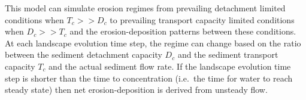 \documentclass[gmd, manuscript]{copernicus}
\begin{document}
%
%


This model can simulate erosion regimes 
from prevailing detachment limited conditions when $T_c >> D_c$ 
to prevailing transport capacity limited conditions when $D_c >> T_c$
and the erosion-deposition patterns between these conditions.
At each landscape evolution time step, the regime can change based on 
the ratio between the sediment detachment capacity $D_c$
and the sediment transport capacity $T_c$ and the actual sediment flow rate.
If the landscape evolution time step is shorter than the time to concentration 
(i.e.~the time for water to reach steady state)
then net erosion-deposition is derived from unsteady flow.
\end{document}
